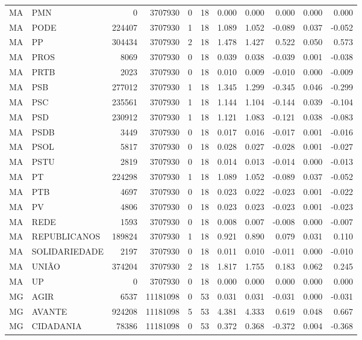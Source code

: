 \begin{landscape}
\begin{longtable}{llrrrrrrrrr}
MA & PMN & 0 & 3707930 & 0 & 18 & 0.000 & 0.000 & 0.000 & 0.000 & 0.000 \\
MA & PODE & 224407 & 3707930 & 1 & 18 & 1.089 & 1.052 & -0.089 & 0.037 & -0.052 \\
MA & PP & 304434 & 3707930 & 2 & 18 & 1.478 & 1.427 & 0.522 & 0.050 & 0.573 \\
MA & PROS & 8069 & 3707930 & 0 & 18 & 0.039 & 0.038 & -0.039 & 0.001 & -0.038 \\
MA & PRTB & 2023 & 3707930 & 0 & 18 & 0.010 & 0.009 & -0.010 & 0.000 & -0.009 \\
MA & PSB & 277012 & 3707930 & 1 & 18 & 1.345 & 1.299 & -0.345 & 0.046 & -0.299 \\
MA & PSC & 235561 & 3707930 & 1 & 18 & 1.144 & 1.104 & -0.144 & 0.039 & -0.104 \\
MA & PSD & 230912 & 3707930 & 1 & 18 & 1.121 & 1.083 & -0.121 & 0.038 & -0.083 \\
MA & PSDB & 3449 & 3707930 & 0 & 18 & 0.017 & 0.016 & -0.017 & 0.001 & -0.016 \\
MA & PSOL & 5817 & 3707930 & 0 & 18 & 0.028 & 0.027 & -0.028 & 0.001 & -0.027 \\
MA & PSTU & 2819 & 3707930 & 0 & 18 & 0.014 & 0.013 & -0.014 & 0.000 & -0.013 \\
MA & PT & 224298 & 3707930 & 1 & 18 & 1.089 & 1.052 & -0.089 & 0.037 & -0.052 \\
MA & PTB & 4697 & 3707930 & 0 & 18 & 0.023 & 0.022 & -0.023 & 0.001 & -0.022 \\
MA & PV & 4806 & 3707930 & 0 & 18 & 0.023 & 0.023 & -0.023 & 0.001 & -0.023 \\
MA & REDE & 1593 & 3707930 & 0 & 18 & 0.008 & 0.007 & -0.008 & 0.000 & -0.007 \\
MA & REPUBLICANOS & 189824 & 3707930 & 1 & 18 & 0.921 & 0.890 & 0.079 & 0.031 & 0.110 \\
MA & SOLIDARIEDADE & 2197 & 3707930 & 0 & 18 & 0.011 & 0.010 & -0.011 & 0.000 & -0.010 \\
MA & UNIÃO & 374204 & 3707930 & 2 & 18 & 1.817 & 1.755 & 0.183 & 0.062 & 0.245 \\
MA & UP & 0 & 3707930 & 0 & 18 & 0.000 & 0.000 & 0.000 & 0.000 & 0.000 \\
MG & AGIR & 6537 & 11181098 & 0 & 53 & 0.031 & 0.031 & -0.031 & 0.000 & -0.031 \\
MG & AVANTE & 924208 & 11181098 & 5 & 53 & 4.381 & 4.333 & 0.619 & 0.048 & 0.667 \\
MG & CIDADANIA & 78386 & 11181098 & 0 & 53 & 0.372 & 0.368 & -0.372 & 0.004 & -0.368 \\

\end{longtable}
\end{landscape}
